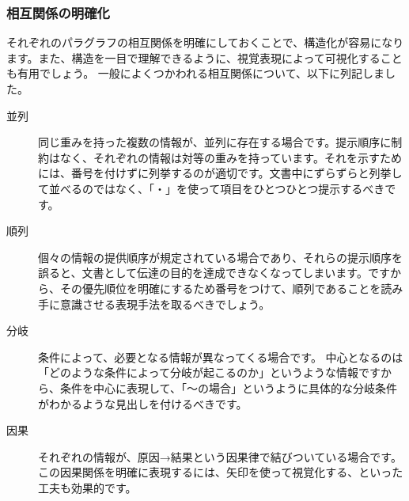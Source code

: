 \documentclass[12pt,a4paper]{jsarticle}
\begin{document}
\subsubsection{相互関係の明確化}

それぞれのパラグラフの相互関係を明確にしておくことで、構造化が容易になります。また、構造を一目で理解できるように、視覚表現によって可視化することも有用でしょう。
一般によくつかわれる相互関係について、以下に列記しました。

\begin{description}
\item[並列]
同じ重みを持った複数の情報が、並列に存在する場合です。提示順序に制約はなく、それぞれの情報は対等の重みを持っています。それを示すためには、番号を付けずに列挙するのが適切です。文書中にずらずらと列挙して並べるのではなく、「・」を使って項目をひとつひとつ提示するべきです。
\item[順列]
個々の情報の提供順序が規定されている場合であり、それらの提示順序を誤ると、文書として伝達の目的を達成できなくなってしまいます。ですから、その優先順位を明確にするため番号をつけて、順列であることを読み手に意識させる表現手法を取るべきでしょう。
\item[分岐]
条件によって、必要となる情報が異なってくる場合です。 中心となるのは「どのような条件によって分岐が起こるのか」というような情報ですから、条件を中心に表現して、「～の場合」というように具体的な分岐条件がわかるような見出しを付けるべきです。
\item[因果]
それぞれの情報が、原因→結果という因果律で結びついている場合です。この因果関係を明確に表現するには、矢印を使って視覚化する、といった工夫も効果的です。
\end{description}
\end{document}
